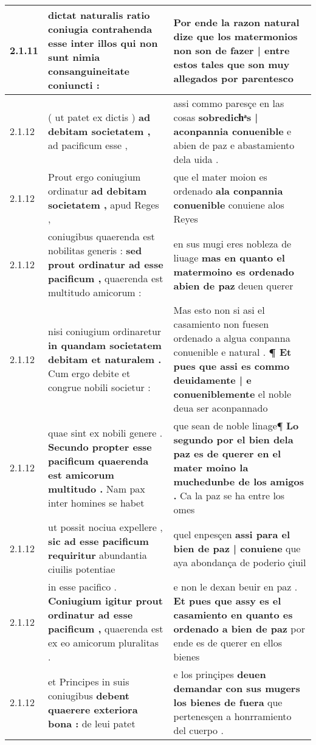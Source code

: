 \begin{tabular}{|p{1cm}|p{6.5cm}|p{6.5cm}|}
2.1.11 & dictat naturalis \textbf{ ratio coniugia contrahenda esse inter illos } qui non sunt nimia consanguineitate coniuncti : & Por ende la razon natural dize \textbf{ que los matermonios non son de fazer | entre estos tales } que son muy allegados por parentesco \\\hline
2.1.12 & ( ut patet ex dictis ) \textbf{ ad debitam societatem , } ad pacificum esse , & assi commo paresçe en las cosas \textbf{ sobredichͣs | aconpannia conuenible } e abien de paz e abastamiento dela uida . \\\hline
2.1.12 & Prout ergo coniugium ordinatur \textbf{ ad debitam societatem , } apud Reges , & que el mater moion es ordenado \textbf{ ala conpannia conuenible } conuiene alos Reyes \\\hline
2.1.12 & coniugibus quaerenda est nobilitas generis : \textbf{ sed prout ordinatur ad esse pacificum , } quaerenda est multitudo amicorum : & en sus mugi eres nobleza de liuage \textbf{ mas en quanto el matermoino es ordenado abien de paz } deuen querer \\\hline
2.1.12 & nisi coniugium ordinaretur \textbf{ in quandam societatem debitam et naturalem . } Cum ergo debite et congrue nobili societur : & Mas esto non si asi el casamiento non fuesen ordenado a algua conpanna conuenible e natural . \textbf{ ¶ Et pues que assi es commo deuidamente | e conueniblemente } el noble deua ser aconpannado \\\hline
2.1.12 & quae sint ex nobili genere . \textbf{ Secundo propter esse pacificum quaerenda est amicorum multitudo . } Nam pax inter homines se habet & que sean de noble linage¶ \textbf{ Lo segundo por el bien dela paz es de querer en el mater moino la muchedunbe de los amigos . } Ca la paz se ha entre los omes \\\hline
2.1.12 & ut possit nociua expellere , \textbf{ sic ad esse pacificum requiritur } abundantia ciuilis potentiae & quel enpesçen \textbf{ assi para el bien de paz | conuiene } que aya abondança de poderio çiuil \\\hline
2.1.12 & in esse pacifico . \textbf{ Coniugium igitur prout ordinatur ad esse pacificum , } quaerenda est ex eo amicorum pluralitas . & e non le dexan beuir en paz . \textbf{ Et pues que assy es el casamiento en quanto es ordenado a bien de paz } por ende es de querer en ellos bienes \\\hline
2.1.12 & et Principes in suis coniugibus \textbf{ debent quaerere exteriora bona : } de leui patet & e los prinçipes \textbf{ deuen demandar con sus mugers los bienes de fuera } que pertenesçen a honrramiento del cuerpo . \\\hline

\end{tabular}
